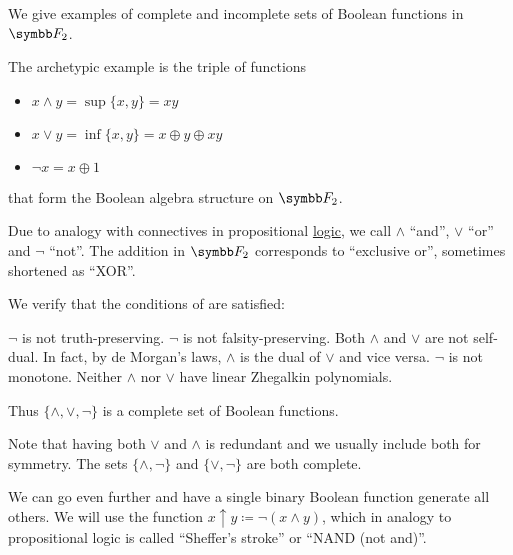 \begin{example}\label{ex:posts_completeness_theorem}
  We give examples of complete and incomplete sets of Boolean functions in \( \BF_2 \).

  \begin{exenum}
     The archetypic example is the triple of functions
    \begin{itemize}
     \item \( x \land y = \sup \{ x, y \} = xy \)
     \item \( x \lor y = \inf \{ x, y \} = x \oplus y \oplus xy \)
     \item \( \neg x = x \oplus 1 \)
    \end{itemize}
    that form the Boolean algebra structure on \( \BF_2 \).

    Due to analogy with connectives in propositional \hyperref[def:propositional_logic_language]{logic}, we call \( \land \) \enquote{and}, \( \lor \) \enquote{or} and \( \neg \) \enquote{not}. The addition in \( \BF_2 \) corresponds to \enquote{exclusive or}, sometimes shortened as \enquote{XOR}.

    We verify that the conditions of  are satisfied:
    \begin{description}
       \( \neg \) is not truth-preserving.
       \( \neg \) is not falsity-preserving.
       Both \( \land \) and \( \lor \) are not self-dual. In fact, by de Morgan's laws, \( \land \) is the dual of \( \lor \) and vice versa.
       \( \neg \) is not monotone.
       Neither \( \land \) nor \( \lor \) have linear Zhegalkin polynomials.
    \end{description}

    Thus \( \{ \land, \lor, \neg \} \) is a complete set of Boolean functions.

    Note that having both \( \lor \) and \( \land \) is redundant and we usually include both for symmetry. The sets \( \{ \land, \neg \} \) and \( \{ \lor, \neg \} \) are both complete.

     We can go even further and have a single binary Boolean function generate all others. We will use the function \( x \uparrow y \coloneqq \neg(x \land y) \), which in analogy to propositional logic is called \enquote{Sheffer's stroke} or \enquote{NAND (not and)}.


\end{exenum}
\end{example}
